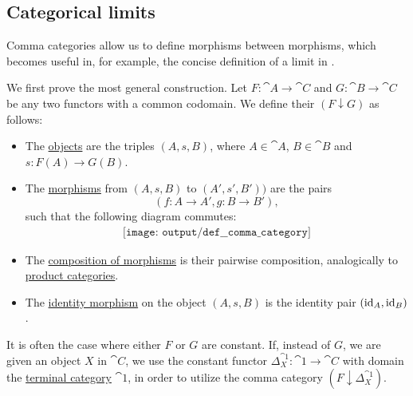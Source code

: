 \subsection{Categorical limits}\label{subsec:categorical_limits}

\begin{definition}\label{def:comma_category}
  Comma categories allow us to define morphisms between morphisms, which becomes useful in, for example, the concise definition of a limit in .

  \begin{thmenum}
     We first prove the most general construction. Let \( F: \cat{A} \to \cat{C} \) and \( G: \cat{B} \to \cat{C} \) be any two functors with a common codomain. We define their  \( (F \downarrow G) \) as follows:

    \begin{itemize}
      \item The \hyperref[def:category/objects]{objects} are the triples \( (A, s, B) \), where \( A \in \cat{A} \), \( B \in \cat{B} \) and \( s: F(A) \to G(B) \).

      \item The \hyperref[def:category/morphisms]{morphisms} from \( (A, s, B) \) to \( (A', s', B')) \) are the pairs
      \begin{equation*}
        (f: A \to A', g: B \to B'),
      \end{equation*}
      such that the following diagram commutes:
      \begin{equation}\label{eq:def:comma_category/variable}
        \begin{aligned}
          \texttt{[image: output/def\_\_comma\_category]}
        \end{aligned}
      \end{equation}

      \item The \hyperref[def:category/composition]{composition of morphisms} is their pairwise composition, analogically to \hyperref[def:product_category]{product categories}.

      \item The \hyperref[def:category/identity]{identity morphism} on the object \( (A, s, B) \) is the identity pair \( (\operatorname{id}_A, \operatorname{id}_B) \).
    \end{itemize}

     It is often the case where either \( F \) or \( G \) are constant. If, instead of \( G \), we are given an object \( X \) in \( \cat{C} \), we use the constant functor \( \Delta_X^{\cat{1}}: \cat{1} \to \cat{C} \) with domain the \hyperref[def:universal_categories]{terminal category} \( \cat{1} \), in order to utilize the comma category \( (F \downarrow \Delta_X^{\cat{1}}) \).


\end{thmenum}
\end{definition}
